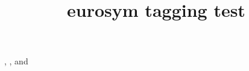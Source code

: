 \documentclass{article}
\title{eurosym tagging test}
\begin{document}
\officialeuro{}, \geneuro{}, \geneuronarrow{} and \geneurowide{}
\end{document}
